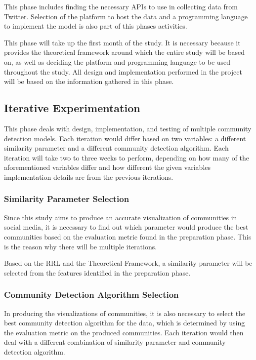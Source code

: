 This phase includes finding the necessary API\vtick s to use in collecting data from Twitter. Selection of the platform to host the data and a programming language to implement the model is also part of this phase\vtick s activities. 


This phase will take up the first month of the study. It is necessary because it provides the theoretical framework around which the entire study will be based on, as well as deciding the platform and programming language to be used throughout the study. All design and implementation performed in the project will be based on the information gathered in this phase.


\subsection{Iterative Experimentation}


This phase deals with design, implementation, and testing of multiple community detection models. Each iteration would differ based on two variables: a different similarity parameter and a different community detection algorithm. Each iteration will take two to three weeks to perform, depending on how many of the aforementioned variables differ and how different the given variable\vtick s implementation details are from the previous iteration\vtick s.


\subsubsection{Similarity Parameter Selection}


Since this study aims to produce an accurate visualization of communities in social media, it is necessary to find out which parameter would produce the best communities based on the evaluation metric found in the preparation phase. This is the reason why there will be multiple iterations. 


Based on the RRL and the Theoretical Framework, a similarity parameter will be selected from the features identified in the preparation phase.


\subsubsection{Community Detection Algorithm Selection}


In producing the visualizations of communities, it is also necessary to select the best community detection algorithm for the data, which is determined by using the evaluation metric on the produced communities. Each iteration would then deal with a different combination of similarity parameter and community detection algorithm.


